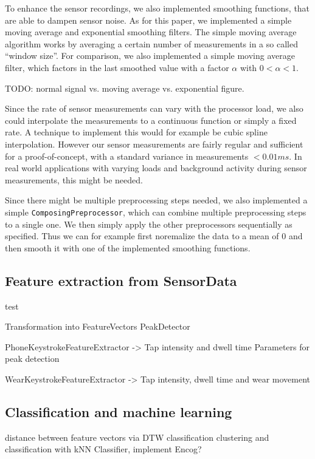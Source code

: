 To enhance the sensor recordings, we also implemented smoothing functions, that are able to dampen sensor noise. As for this paper, we implemented a simple moving average and exponential smoothing filters. The simple moving average algorithm works by averaging a certain number of measurements in a so called ``window size''. For comparison, we also implemented a simple moving average filter, which factors in the last smoothed value with a factor $\alpha$ with $0 < \alpha < 1$.

TODO: normal signal vs. moving average vs. exponential figure.

Since the rate of sensor measurements can vary with the processor load, we also could interpolate the measurements to a continuous function or simply a fixed rate. A technique to implement this would for example be cubic spline interpolation. However our sensor measurements are fairly regular and sufficient for a proof-of-concept, with a standard variance in measurements $< 0.01ms$. In real world applications with varying loads and background activity during sensor measurements, this might be needed.

Since there might be multiple preprocessing steps needed, we also implemented a simple \lstinline$ComposingPreprocessor$, which can combine multiple preprocessing steps to a single one. We then simply apply the other preprocessors sequentially as specified. Thus we can for example first noremalize the data to a mean of 0 and then smooth it with one of the implemented smoothing functions.

\subsection{Feature extraction from SensorData}\label{subsection:featureextraction}
test

Transformation into FeatureVectors
PeakDetector

PhoneKeystrokeFeatureExtractor -> Tap intensity and dwell time
Parameters for peak detection

WearKeystrokeFeatureExtractor -> Tap intensity, dwell time and wear movement

\subsection{Classification and machine learning}

distance between feature vectors via DTW classification
clustering and classification with kNN Classifier, implement Encog?

